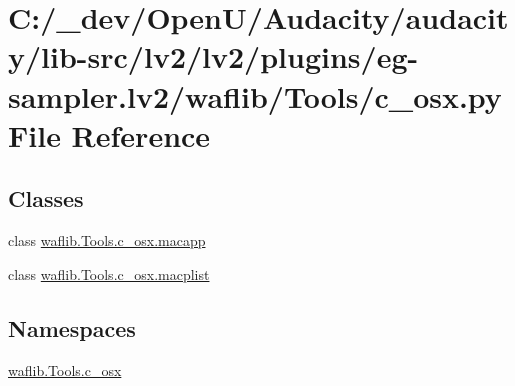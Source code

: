\hypertarget{lv2_2plugins_2eg-sampler_8lv2_2waflib_2_tools_2c__osx_8py}{}\section{C\+:/\+\_\+dev/\+Open\+U/\+Audacity/audacity/lib-\/src/lv2/lv2/plugins/eg-\/sampler.lv2/waflib/\+Tools/c\+\_\+osx.py File Reference}
\label{lv2_2plugins_2eg-sampler_8lv2_2waflib_2_tools_2c__osx_8py}
\subsection*{Classes}
\begin{DoxyCompactItemize}
\item 
class \hyperlink{classwaflib_1_1_tools_1_1c__osx_1_1macapp}{waflib.\+Tools.\+c\+\_\+osx.\+macapp}
\item 
class \hyperlink{classwaflib_1_1_tools_1_1c__osx_1_1macplist}{waflib.\+Tools.\+c\+\_\+osx.\+macplist}
\end{DoxyCompactItemize}
\subsection*{Namespaces}
\begin{DoxyCompactItemize}
\item 
 \hyperlink{namespacewaflib_1_1_tools_1_1c__osx}{waflib.\+Tools.\+c\+\_\+osx}
\end{DoxyCompactItemize}

